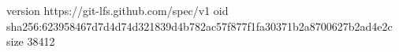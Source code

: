 version https://git-lfs.github.com/spec/v1
oid sha256:623958467d7d4d74d321839d4b782ac57f877f1fa30371b2a8700627b2ad4e2c
size 38412
